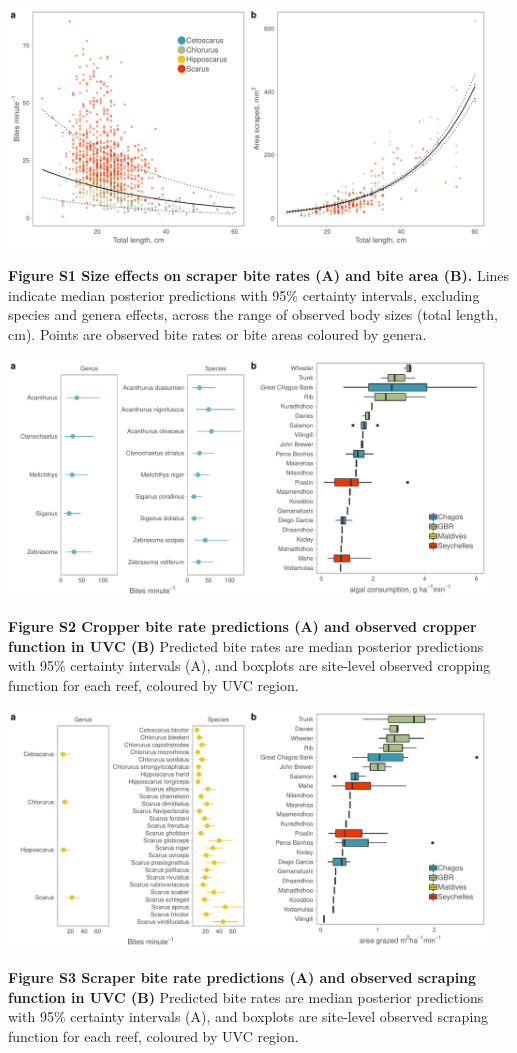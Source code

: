 \documentclass[12pt,]{article}
\begin{document}
~

\begin{center}\includegraphics[width=480px]{../../figures/FigureS1_scrape_size} \end{center}

\textbf{Figure S1 \textbar{} Size effects on scraper bite rates (A) and
bite area (B).} Lines indicate median posterior predictions with 95\%
certainty intervals, excluding species and genera effects, across the
range of observed body sizes (total length, cm). Points are observed
bite rates or bite areas coloured by genera.

\newpage

\begin{center}\includegraphics[width=480px]{../../figures/FigureS2_cropper_bites} \end{center}

\textbf{Figure S2 \textbar{} Cropper bite rate predictions (A) and
observed cropper function in UVC (B)} Predicted bite rates are median
posterior predictions with 95\% certainty intervals (A), and boxplots
are site-level observed cropping function for each reef, coloured by UVC
region.

\newpage

\begin{center}\includegraphics[width=480px]{../../figures/FigureS3_scraper_bites} \end{center}

\textbf{Figure S3 \textbar{} Scraper bite rate predictions (A) and
observed scraping function in UVC (B)} Predicted bite rates are median
posterior predictions with 95\% certainty intervals (A), and boxplots
are site-level observed scraping function for each reef, coloured by UVC
region.

\newpage
\end{document}
